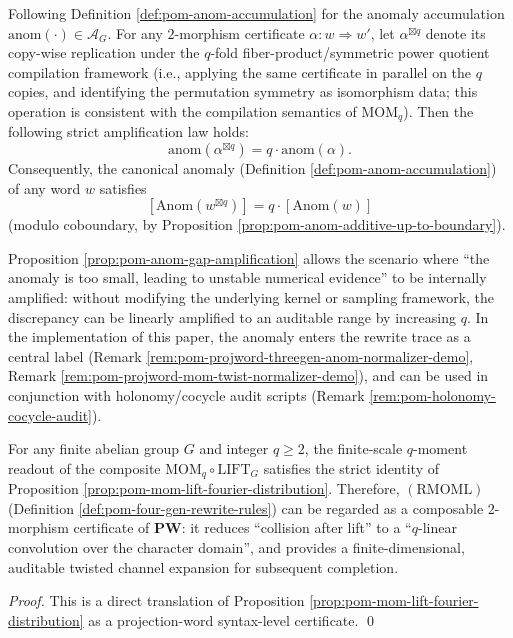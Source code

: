 \begin{proposition}\label{prop:pom-anom-gap-amplification}
Following Definition \ref{def:pom-anom-accumulation} for the anomaly accumulation \(\mathrm{anom}(\cdot)\in\mathcal{A}_G\).
For any \(2\)-morphism certificate \(\alpha:w\Rightarrow w'\), let \(\alpha^{\boxtimes q}\) denote its copy-wise replication under the \(q\)-fold fiber-product/symmetric power quotient compilation framework (i.e., applying the same certificate in parallel on the \(q\) copies, and identifying the permutation symmetry as isomorphism data; this operation is consistent with the compilation semantics of \(\mathrm{MOM}_q\)).
Then the following strict amplification law holds:
\[
\boxed{\;\mathrm{anom}(\alpha^{\boxtimes q})=q\cdot \mathrm{anom}(\alpha).\;}
\]
Consequently, the canonical anomaly (Definition \ref{def:pom-anom-accumulation}) of any word \(w\) satisfies
\[
\boxed{\;[\mathrm{Anom}(w^{\boxtimes q})]=q\cdot [\mathrm{Anom}(w)]\;}
\]
(modulo coboundary, by Proposition \ref{prop:pom-anom-additive-up-to-boundary}).
\end{proposition}

\begin{remark}\label{rem:pom-anom-gap-amplification-meaning}
Proposition \ref{prop:pom-anom-gap-amplification} allows the scenario where ``the anomaly is too small, leading to unstable numerical evidence'' to be internally amplified:
without modifying the underlying kernel or sampling framework, the discrepancy can be linearly amplified to an auditable range by increasing \(q\).
In the implementation of this paper, the anomaly enters the rewrite trace as a central label (Remark \ref{rem:pom-projword-threegen-anom-normalizer-demo}, Remark \ref{rem:pom-projword-mom-twist-normalizer-demo}), and can be used in conjunction with holonomy/cocycle audit scripts (Remark \ref{rem:pom-holonomy-cocycle-audit}).
\end{remark}

\begin{proposition}\label{prop:pom-rmoml-sound}
For any finite abelian group \(G\) and integer \(q\ge 2\), the finite-scale \(q\)-moment readout of the composite \(\mathrm{MOM}_q\circ \mathrm{LIFT}_G\) satisfies the strict identity of Proposition \ref{prop:pom-mom-lift-fourier-distribution}.
Therefore, \((\mathrm{RMOML})\) (Definition \ref{def:pom-four-gen-rewrite-rules}) can be regarded as a composable \(2\)-morphism certificate of \(\mathbf{PW}\): it reduces ``collision after lift'' to a ``\(q\)-linear convolution over the character domain'', and provides a finite-dimensional, auditable twisted channel expansion for subsequent completion.
\end{proposition}
\begin{proof}
This is a direct translation of Proposition \ref{prop:pom-mom-lift-fourier-distribution} as a projection-word syntax-level certificate. \qed
\end{proof}

